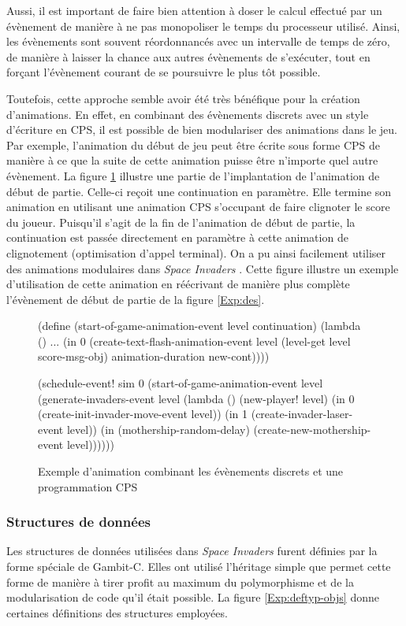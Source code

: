 \documentclass[12pt,twoside,letterpaper,francais]{book}
\newcommand{\si}{{\textit{Space Invaders }}}
\newcommand{\scheme}[1]{\selectlanguage{english}{\tt #1}\selectlanguage{french}}
\begin{document}
Aussi, il est important de faire bien attention à doser le calcul
effectué par un évènement de manière à ne pas monopoliser le temps du
processeur utilisé. Ainsi, les évènements sont souvent réordonnancés
avec un intervalle de temps de zéro, de manière à laisser la chance
aux autres évènements de s'exécuter, tout en forçant l'évènement
courant de se poursuivre le plus tôt possible.

Toutefois, cette approche semble avoir été très bénéfique pour la
création d'animations. En effet, en combinant des évènements discrets
avec un style d'écriture en CPS, il est possible de bien modulariser
des animations dans le jeu. Par exemple, l'animation du début de jeu
peut être écrite sous forme CPS de manière à ce que la suite de cette
animation puisse être n'importe quel autre évènement. La figure
\ref{Exp:anim} illustre une partie de l'implantation de l'animation de
début de partie. Celle-ci reçoit une continuation en paramètre. Elle
termine son animation en utilisant une animation CPS s'occupant de
faire clignoter le score du joueur. Puisqu'il s'agit de la fin de
l'animation de début de partie, la continuation est passée directement
en paramètre à cette animation de clignotement (optimisation d'appel
terminal). On a pu ainsi facilement utiliser des animations modulaires
dans \si. Cette figure illustre un exemple d'utilisation de cette
animation en réécrivant de manière plus complète l'évènement de début
de partie de la figure \ref{Exp:des}.\\

\begin{figure}[htb!]
  \begin{schemecode}
(define (start-of-game-animation-event level continuation)
  (lambda ()
    ...
    (in 0 (create-text-flash-animation-event level
            (level-get level score-msg-obj)
            animation-duration new-cont))))

(schedule-event! sim 0
  (start-of-game-animation-event level
    (generate-invaders-event level
      (lambda ()
        (new-player! level)
        (in 0 (create-init-invader-move-event level))
        (in 1 (create-invader-laser-event level))
        (in (mothership-random-delay)
            (create-new-mothership-event level))))))
  \end{schemecode}
  \caption{Exemple d'animation combinant les évènements discrets et
    une programmation CPS}
  \label{Exp:anim}
\end{figure}


\FloatBarrier
\subsubsection{Structures de données}
Les structures de données utilisées dans \si furent définies par la
forme spéciale \scheme{define-type} de Gambit-C. Elles ont utilisé
l'héritage simple que permet cette forme de manière à tirer profit au
maximum du polymorphisme et de la modularisation de code qu'il était
possible. La figure \ref{Exp:deftyp-objs} donne certaines définitions
des structures employées.\\
\end{document}
